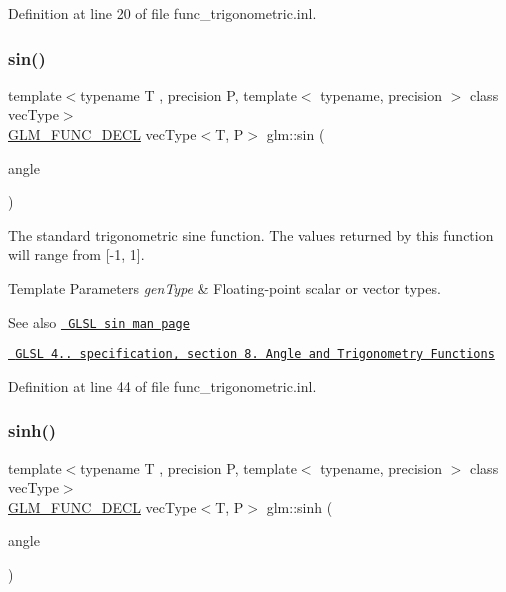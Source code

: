 Definition at line 20 of file func\+\_\+trigonometric.\+inl.

\mbox{\label{group__core__func__trigonometric_ga4a0ddceb6b1e64ce0e4da209dcb021d5}} 
\subsubsection{\texorpdfstring{sin()}{sin()}}
{\footnotesize\ttfamily template$<$typename T , precision P, template$<$ typename, precision $>$ class vec\+Type$>$ \\
\mbox{\hyperlink{setup_8hpp_ab2d052de21a70539923e9bcbf6e83a51}{G\+L\+M\+\_\+\+F\+U\+N\+C\+\_\+\+D\+E\+CL}} vec\+Type$<$T, P$>$ glm\+::sin (\begin{DoxyParamCaption}\item[{vec\+Type$<$ T, P $>$ const \&}]{angle }\end{DoxyParamCaption})}

The standard trigonometric sine function. The values returned by this function will range from \mbox{[}-\/1, 1\mbox{]}.


\begin{DoxyTemplParams}{Template Parameters}
{\em gen\+Type} & Floating-\/point scalar or vector types.\\
\hline
\end{DoxyTemplParams}
\begin{DoxySeeAlso}{See also}
\href{http://www.opengl.org/sdk/docs/manglsl/xhtml/sin.xml}{\texttt{ G\+L\+SL sin man page}} 

\href{http://www.opengl.org/registry/doc/GLSLangSpec.4.20.8.pdf}{\texttt{ G\+L\+SL 4.. specification, section 8. Angle and Trigonometry Functions}} 
\end{DoxySeeAlso}


Definition at line 44 of file func\+\_\+trigonometric.\+inl.

\mbox{\label{group__core__func__trigonometric_gad8f89c12efe6f8d3ae8046625b266254}} 
\subsubsection{\texorpdfstring{sinh()}{sinh()}}
{\footnotesize\ttfamily template$<$typename T , precision P, template$<$ typename, precision $>$ class vec\+Type$>$ \\
\mbox{\hyperlink{setup_8hpp_ab2d052de21a70539923e9bcbf6e83a51}{G\+L\+M\+\_\+\+F\+U\+N\+C\+\_\+\+D\+E\+CL}} vec\+Type$<$T, P$>$ glm\+::sinh (\begin{DoxyParamCaption}\item[{vec\+Type$<$ T, P $>$ const \&}]{angle }\end{DoxyParamCaption})}

